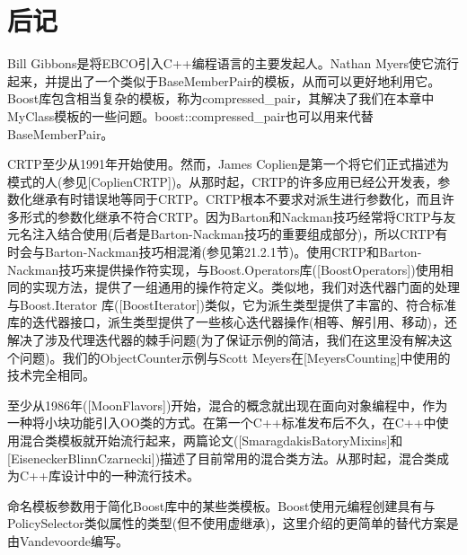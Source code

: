 \section{后记}
Bill Gibbons是将EBCO引入C++编程语言的主要发起人。Nathan Myers使它流行起来，并提出了一个类似于BaseMemberPair的模板，从而可以更好地利用它。Boost库包含相当复杂的模板，称为compressed\_pair，其解决了我们在本章中MyClass模板的一些问题。boost::compressed\_pair也可以用来代替BaseMemberPair。

CRTP至少从1991年开始使用。然而，James Coplien是第一个将它们正式描述为模式的人(参见[CoplienCRTP])。从那时起，CRTP的许多应用已经公开发表，参数化继承有时错误地等同于CRTP。CRTP根本不要求对派生进行参数化，而且许多形式的参数化继承不符合CRTP。因为Barton和Nackman技巧经常将CRTP与友元名注入结合使用(后者是Barton-Nackman技巧的重要组成部分)，所以CRTP有时会与Barton-Nackman技巧相混淆(参见第21.2.1节)。使用CRTP和Barton-Nackman技巧来提供操作符实现，与Boost.Operators库([BoostOperators])使用相同的实现方法，提供了一组通用的操作符定义。类似地，我们对迭代器门面的处理与Boost.Iterator 库([BoostIterator])类似，它为派生类型提供了丰富的、符合标准库的迭代器接口，派生类型提供了一些核心迭代器操作(相等、解引用、移动)，还解决了涉及代理迭代器的棘手问题(为了保证示例的简洁，我们在这里没有解决这个问题)。我们的ObjectCounter示例与Scott Meyers在[MeyersCounting]中使用的技术完全相同。

至少从1986年([MoonFlavors])开始，混合的概念就出现在面向对象编程中，作为一种将小块功能引入OO类的方式。在第一个C++标准发布后不久，在C++中使用混合类模板就开始流行起来，两篇论文([SmaragdakisBatoryMixins]和[EiseneckerBlinnCzarnecki])描述了目前常用的混合类方法。从那时起，混合类成为C++库设计中的一种流行技术。

命名模板参数用于简化Boost库中的某些类模板。Boost使用元编程创建具有与PolicySelector类似属性的类型(但不使用虚继承)，这里介绍的更简单的替代方案是由Vandevoorde编写。